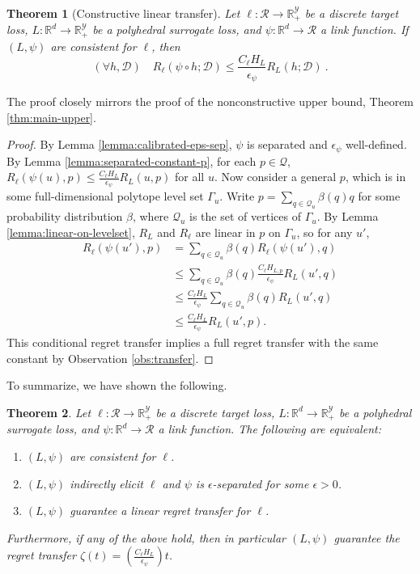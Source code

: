 \documentclass{article}
\newtheorem{theorem}{Theorem}
\theoremstyle{definition}\newtheorem{definition}{Definition}
\theoremstyle{definition}\newtheorem{assumption}{Assumption}
\newcommand{\reals}{\mathbb{R}}
\newcommand{\D}{\mathcal{D}}
\newcommand{\R}{\mathcal{R}}
\newcommand{\Y}{\mathcal{Y}}
\begin{document}
\begin{theorem}[Constructive linear transfer] \label{thm:separated-constant}
  Let $\ell: \R \to \reals_+^{\Y}$ be a discrete target loss, $L: \reals^d \to \reals_+^{\Y}$ be a polyhedral surrogate loss, and $\psi: \reals^d \to \R$ a link function.
  If $(L,\psi)$ are consistent for $\ell$, then
    \[ (\forall h,\D) \quad R_{\ell}(\psi \circ h ; \D) \leq \frac{C_{\ell} H_L}{\epsilon_{\psi}} R_L(h ; \D) ~. \]
\end{theorem}
The proof closely mirrors the proof of the nonconstructive upper bound, Theorem \ref{thm:main-upper}.
\begin{proof}
  By Lemma \ref{lemma:calibrated-eps-sep}, $\psi$ is separated and $\epsilon_{\psi}$ well-defined.
  By Lemma \ref{lemma:separated-constant-p}, for each $p \in \mathcal{Q}$, $R_{\ell}(\psi(u),p) \leq \frac{C_{\ell} H_L}{\epsilon_{\psi}} R_L(u,p)$ for all $u$.
  Now consider a general $p$, which is in some full-dimensional polytope level set $\Gamma_u$.
  Write $p = \sum_{q \in \mathcal{Q}_u} \beta(q) q$ for some probability distribution $\beta$, where $\mathcal{Q}_u$ is the set of vertices of $\Gamma_u$.
  By Lemma \ref{lemma:linear-on-levelset}, $R_L$ and $R_{\ell}$ are linear in $p$ on $\Gamma_u$, so for any $u'$,
  \begin{align*}
    R_{\ell}(\psi(u'),p)
    &=    \sum_{q \in \mathcal{Q}_u} \beta(q) R_{\ell}(\psi(u'), q)  \\
    &\leq \sum_{q \in \mathcal{Q}_u} \beta(q) \frac{C_{\ell} H_{L,p}}{\epsilon_{\psi}} R_L(u', q)  \\
    &\leq \frac{C_{\ell} H_L}{\epsilon_{\psi}} \sum_{q \in \mathcal{Q}_u} \beta(q) R_L(u', q)  \\
    &\leq \frac{C_{\ell} H_L}{\epsilon_{\psi}} R_L(u', p) .
  \end{align*}
  This conditional regret transfer implies a full regret transfer with the same constant by Observation \ref{obs:transfer}.
\end{proof}

To summarize, we have shown the following.

\begin{theorem} \label{thm:tfae}
  Let $\ell: \R \to \reals_+^{\Y}$ be a discrete target loss, $L: \reals^d \to \reals_+^{\Y}$ be a polyhedral surrogate loss, and $\psi: \reals^d \to \R$ a link function.
  The following are equivalent:
  \begin{enumerate}
    \item $(L,\psi)$ are consistent for $\ell$.
    \item $(L,\psi)$ indirectly elicit $\ell$ and $\psi$ is $\epsilon$-separated for some $\epsilon > 0$.
    \item $(L,\psi)$ guarantee a linear regret transfer for $\ell$.
  \end{enumerate}
  Furthermore, if any of the above hold, then in particular $(L,\psi)$ guarantee the regret transfer $\zeta(t) = \left(\frac{C_{\ell} H_L}{\epsilon_{\psi}}\right) t$.
\end{theorem}
\end{document}
